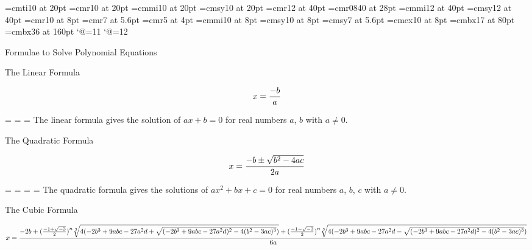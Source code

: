 \ifx\pdfoutput\undefined\relax\else      %
\pdfpagewidth=1189mm
\pdfpageheight=841mm
\pdfhorigin=0mm
\pdfvorigin=0mm\fi
\hsize=1189mm
\vsize=841mm
\font\dir=cmti10 at 20pt
\font\dirdigit=cmr10 at 20pt
\font\dirmath=cmmi10 at 20pt
\font\dirsy=cmsy10 at 20pt
\font\desc=cmr12 at 40pt
\font\descscript=cmr0840 at 28pt
\font\descmath=cmmi12 at 40pt
\font\descsy=cmsy12 at 40pt
\font\quart=cmr10 at 8pt
\font\quartscript=cmr7 at 5.6pt
\font\quartscriptscript=cmr5 at 4pt
\font\quartmath=cmmi10 at 8pt
\font\quartsy=cmsy10 at 8pt
\font\quartscriptsy=cmsy7 at 5.6pt
\font\quartex=cmex10 at 8pt
\font\tit=cmbx17 at 80pt
\font\maintit=cmbx36 at 160pt
\nopagenumbers
\def\sgn{\mathop{\rm sgn}}
\let\obig\big
\def\obigl{\mathopen\obig}
\def\obigr{\mathclose\obig}
\catcode`@=11
\def\big#1{{\hbox{$\left#1\vbox to6.8\p@{}\right.\n@space$}}}
\def\Big#1{{\hbox{$\left#1\vbox to9.2\p@{}\right.\n@space$}}}
\def\bigg#1{{\hbox{$\left#1\vbox to11.6\p@{}\right.\n@space$}}}
\catcode`@=12
\hbox{}
\vfill
\centerline{\maintit Formulae to Solve Polynomial Equations}
\vskip 50mm
\centerline{\tit The Linear Formula}
\vskip 25mm
$$ x = {-b \over a} $$
\vskip 25mm
\centerline{\desc
{}=\desc
{}=\descmath
{}=\descsy
The linear formula gives the solution of $ax+b=0$ for real numbers $a$, $b$ with $a\neq0$.}
\vskip 50mm
\centerline{\tit The Quadratic Formula}
\vskip 25mm
$$ x = {-b \pm \sqrt{b^2-4ac} \over 2a} $$
\vskip 25mm
\centerline{\desc
{}=\desc
{}=\descscript
{}=\descmath
{}=\descsy
The quadratic formula gives the solutions of $ax^2+bx+c=0$ for real numbers $a$, $b$, $c$ with $a\neq0$.}
\vskip 50mm
\centerline{\tit The Cubic Formula}
\vskip 25mm
$$ x = {-2b + \obigl({-1+\sqrt{-3}\over2}\obigr)^n\root3\of{4\obigl(-2b^3+9abc-27a^2d+\sqrt{(-2b^3+9abc-27a^2d)^2-4(b^2-3ac)^3}\obigr)}+\obigl({-1-\sqrt{-3}\over2}\obigr)^n\root3\of{4\obigl(-2b^3+9abc-27a^2d-\sqrt{(-2b^3+9abc-27a^2d)^2-4(b^2-3ac)^3}\obigr)} \over 6a} $$
